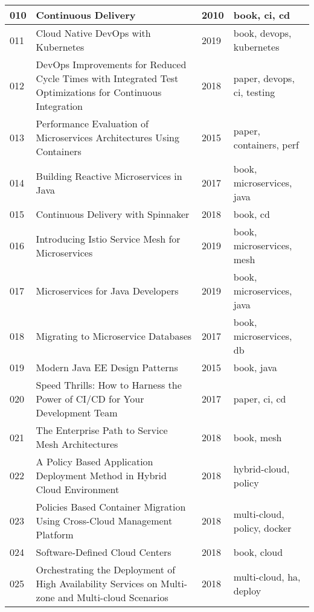 \documentclass[11pt,a4paper]{article}
\begin{document}
\begin{longtable}{L{0.6cm}L{7.5cm}L{0.9cm}L{4cm}}
        010 & Continuous Delivery\cite{coll:010} & 2010 & book, ci, cd \\  & Cloud Native DevOps with Kubernetes\cite{coll:011} & 2019 & book, devops, kubernetes \\  & DevOps Improvements for Reduced Cycle Times with Integrated Test Optimizations for Continuous Integration\cite{coll:012} & 2018 & paper, devops, ci, testing \\  & Performance Evaluation of Microservices Architectures Using Containers\cite{coll:013} & 2015 & paper, containers, perf \\  & Building Reactive Microservices in Java\cite{coll:014} & 2017 & book, microservices, java \\  & Continuous Delivery with Spinnaker\cite{coll:015} & 2018 & book, cd \\  & Introducing Istio Service Mesh for Microservices\cite{coll:016} & 2019 & book, microservices, mesh \\  & Microservices for Java Developers\cite{coll:017} & 2019 & book, microservices, java \\  & Migrating to Microservice Databases\cite{coll:018} & 2017 & book, microservices, db \\  & Modern Java EE Design Patterns\cite{coll:019} & 2015 & book, java \\  & Speed Thrills: How to Harness the Power of CI/CD for Your Development Team\cite{coll:020} & 2017 & paper, ci, cd \\  & The Enterprise Path to Service Mesh Architectures\cite{coll:021} & 2018 & book, mesh \\  & A Policy Based Application Deployment Method in Hybrid Cloud Environment\cite{coll:022} & 2018 & hybrid-cloud, policy \\  & Policies Based Container Migration Using Cross-Cloud Management Platform\cite{coll:023} & 2018 & multi-cloud, policy, docker \\  & Software-Defined Cloud Centers\cite{coll:024} & 2018 & book, cloud \\  & Orchestrating the Deployment of High Availability Services on Multi-zone and Multi-cloud Scenarios\cite{coll:025} & 2018 & multi-cloud, ha, deploy \\ \midrule

\end{longtable}
\end{document}
